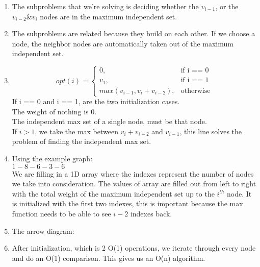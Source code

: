 \documentclass[11pt]{article}
\begin{document}
\begin{enumerate}
\begin{enumerate}
\begin{enumerate}
\item
The subproblems that we're solving is deciding whether the $v_{i-1}$, or the $v_{i-2} \& v_i$ nodes are in the maximum independent set.
\item
The subproblems are related because they build on each other. If we choose a node, the neighbor nodes are automatically taken out of the maximum independent set.
\item
\begin{equation}
opt(i)=\begin{cases}
0, & \text{if i == 0}\\
v_1, & \text{if i == 1}\\
max(v_{i-1}, v_i + v_{i-2}), & \text{otherwise}
\end{cases}
\end{equation}
If i == 0 and i == 1, are the two initialization cases.\\
The weight of nothing is 0.\\
The independent max set of a single node, must be that node.\\
If $i > 1$, we take the max between $v_i + v_{i-2}$ and $v_{i-1}$, this line solves the problem of finding the independent max set.
\item 
Using the example graph:\\
$1 - 8 - 6 - 3 - 6$\\
We are filling in a 1D array where the indexes represent the number of nodes we take into consideration. The values of array are filled out from left to right with the total weight of the maximum independent set up to the $i^{th}$ node. It is initialized with the first two indexes, this is important because the max function needs to be able to see $i - 2$ indexes back.
\vspace*{3cm}
\item
The arrow diagram:\\
\vspace*{3cm}
\item
After initialization, which is 2 O(1) operations, we iterate through every node and do an O(1) comparison. This gives us an O(n) algorithm.
\end{enumerate}
\end{enumerate}


\end{enumerate}
\end{document}
